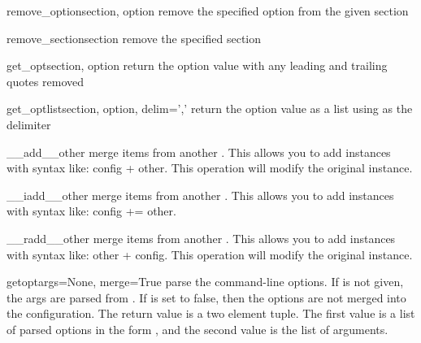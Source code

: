 \documentclass{manual}
\begin{document}
\begin{methoddesc}[ConfigManager]{remove\_option}{section, option}
remove the specified option from the given section
\end{methoddesc}

\begin{methoddesc}[ConfigManager]{remove\_section}{section}
remove the specified section
\end{methoddesc}

\begin{methoddesc}[ConfigManager]{get\_opt}{section, option}
return the option value with any leading and trailing quotes removed
\end{methoddesc}

\begin{methoddesc}[ConfigManager]{get\_optlist}{section, option, delim=','}
return the option value as a list using  as the delimiter
\end{methoddesc}

\begin{methoddesc}[ConfigManager]{\_\_add\_\_}{other}
merge items from another .  This allows you to add
 instances with syntax like: config + other. 
This operation will modify the original instance.
\end{methoddesc}

\begin{methoddesc}[ConfigManager]{\_\_iadd\_\_}{other}
merge items from another .  This allows you to add
 instances with syntax like: config += other.
\end{methoddesc}

\begin{methoddesc}[ConfigManager]{\_\_radd\_\_}{other}
merge items from another .  This allows you to add
 instances with syntax like: other + config.
This operation will modify the original instance.
\end{methoddesc}

\begin{methoddesc}[ConfigManager]{getopt}{args=None, merge=True}
parse the command-line options.  If  is not given, the 
args are parsed from .  If  is set to false,
then the options are not merged into the configuration.  The return value
is a two element tuple.  The first value is a list of parsed options
in the form , and the second value is the list of
arguments.
\end{methoddesc}
\end{document}
